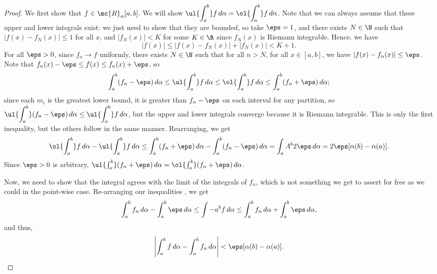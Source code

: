 \begin{proof}
	We first show that \(f\in\mc{R}_{\alpha}[a,b]\). We will show \(\displaystyle\ul{\int_a^b} f \, d\alpha=\ol{\int_a^b} f \, d\alpha\). Note that we can always assume that these upper and lower integrals exist: we just need to show that they are bounded, so take \(\eps=1\), and there exists \(N\in\N\) such that \(|f(x)-f_N(x)|\leq 1\) for all \(x\), and \(|f_N(x)|<K\) for some \(K\in\R\) since \(f_N(x)\) is Riemann integrable. Hence. we have 
	\begin{equation*}
		|f(x)|\leq |f(x)-f_N(x)|+|f_N(x)|<K+1.
	\end{equation*}
	For all \(\eps>0\), since \(f_n\to f\) uniformly, there exists \(N\in\N\) such that for all \(n>N\), for all \(x\in[a,b]\), we have \(|f(x)-f_n(x)|\leq\eps\). Note that \(f_n(x)-\eps\leq f(x)\leq f_n(x)+\eps\), so 
	\begin{equation*}
		\int_a^b (f_n-\eps) \, d\alpha\leq \ul{\int_a^b} f \, d\alpha\leq\ol{\int_a^b}f\, d\alpha\leq \int_a^b(f_n+\eps) \, d\alpha;
	\end{equation*}
	since each \(m_i\) is the greatest lower bound, it is greater than \(f_n-\eps\) on each interval for any partition, so \(\displaystyle\ul{\int_a^b} (f_n-\eps) \, d\alpha\leq \ul{\int_a^b} f \, d\alpha\), but the upper and lower integrals converge because it is Riemann integrable. This is only the first inequality, but the others follow in the same manner. Rearranging, we get 
	\begin{equation*}
		\ol{\int_a^b} f \, d\alpha-\ul{\int_a^b} f \, d\alpha\leq \int_a^b (f_n+\eps) \, d\alpha-\int_a^b (f_n-\eps) \, d\alpha=\int_aA^b 2\eps \, d\alpha= 2\eps[\alpha(b)-\alpha(a)].
	\end{equation*}
	Since \(\eps>0\) is arbitrary, \(\ul{\int_a^b} (f_n+\eps) \, d\alpha=\ol{\int_a^b} (f_n+\eps) \, d\alpha\).
	
	\medskip
	
	Now, we need to show that the integral agrees with the limit of the integrals of \(f_n\), which is not something we get to assert for free as we could in the point-wise case. Re-arranging our inequalities , we get 
	\begin{equation*}
		\int_a^b f_n \, d\alpha-\int_a^b\eps \, d\alpha\leq \int-a^b f \, d\alpha\leq \int_a^b f_n \, d\alpha+\int_a^b \eps \, d\alpha,
	\end{equation*}
	and thus, 
	\begin{equation*}
		\left|\int_a^b f \, d\alpha-\int_a^b f_n \, d\alpha\right|<\eps[\alpha(b)-\alpha(a)].
	\end{equation*}
\end{proof}

